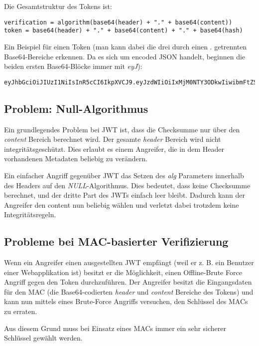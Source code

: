 Die Gesamtstruktur des Tokens ist:

\begin{verbatim}
verification = algorithm(base64(header) + "." + base64(content))
token = base64(header) + "." + base64(content) + "." + base64(hash)
\end{verbatim}

Ein Beispiel für einen Token (man kann dabei die drei durch einen . getrennten Base64-Bereiche erkennen. Da es sich um encoded JSON handelt, beginnen die beiden ersten Base64-Blöcke immer mit \textit{eyJ}):

\begin{verbatim}
eyJhbGciOiJIUzI1NiIsInR5cCI6IkpXVCJ9.eyJzdWIiOiIxMjM0NTY3ODkwIiwibmFtZSI6IkpvaG4gRG9lIiwiaWF0IjoxNTE2MjM5MDIyfQ.SflKxwRJSMeKKF2QT4fwpMeJf36POk6yJV_adQssw5c
\end{verbatim}

\subsection{Problem: Null-Algorithmus}

Ein grundlegendes Problem bei JWT ist, dass die Checksumme nur über den \textit{content} Bereich berechnet wird. Der gesamte \textit{header} Bereich wird nicht integritätsgeschützt. Dies erlaubt es einem Angreifer, die in dem Header vorhandenen Metadaten beliebig zu verändern.

Ein einfacher Angriff gegenüber JWT das Setzen des \textit{alg} Parameters innerhalb des Headers auf den \textit{NULL}-Algorithmus. Dies bedeutet, dass keine Checksumme berechnet, und der dritte Part des JWTs einfach leer bleibt. Dadurch kann der Angreifer den content nun beliebig wählen und verletzt dabei trotzdem keine Integritätsregeln.

\subsection{Probleme bei MAC-basierter Verifizierung}

Wenn ein Angreifer einen ausgestellten JWT empfängt (weil er z. B. ein Benutzer einer Webapplikation ist) besitzt er die Möglichkeit, einen Offline-Brute Force Angriff gegen den Token durchzuführen. Der Angreifer besitzt die Eingangsdaten für den MAC (die Base64-codierten \textit{header} und \textit{content} Bereiche des Tokens) und kann nun mittels eines Brute-Force Angriffs versuchen, den Schlüssel des MACs zu erraten.

Aus diesem Grund muss bei Einsatz eines MACs immer ein sehr sicherer Schlüssel gewählt werden.

